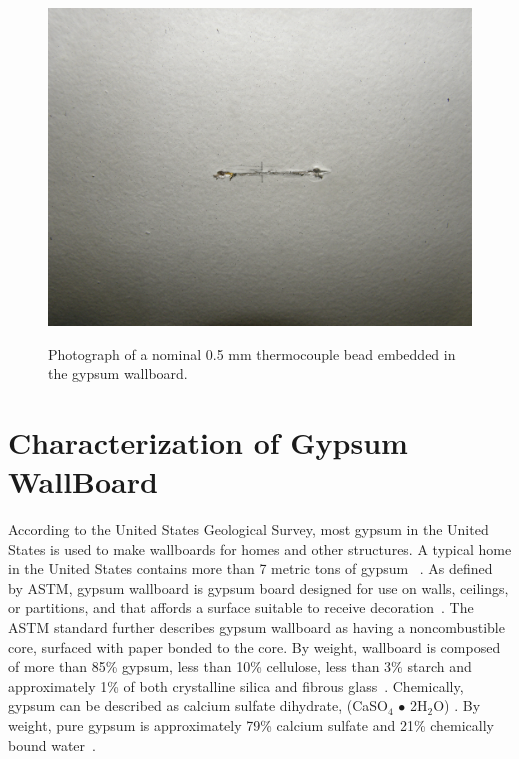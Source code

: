 \documentclass[twoside]{uocthesis}
\begin{document}
{ \begin{figure}
 	\centering
 	\includegraphics[width=\textwidth]{../Figures/IWGB_TC_Slit}\\
 	\caption[Photograph of a thermocouple embedded in the gypsum wallboard]{Photograph of a nominal 0.5 mm thermocouple bead embedded in the gypsum wallboard.}
 	\label{IWGB_TC_Slit}
 \end{figure}


\section{Characterization of Gypsum WallBoard}

According to the United States Geological Survey, most gypsum in the United States is used to make wallboards for homes and other structures.  A typical home in the United States contains more than 7 metric tons of gypsum ~\cite{USGS:2015}.  As defined by ASTM, gypsum wallboard is gypsum board designed for use on walls, ceilings, or partitions, and that affords a surface suitable to receive decoration~\cite{ASTM_C1396}. The ASTM standard further describes gypsum wallboard as having a noncombustible core, surfaced with paper bonded to the core. By weight, wallboard is composed of more than 85\% gypsum, less than 10\% cellulose, less than 3\% starch and approximately 1\% of both crystalline silica and fibrous glass~\cite{GA:2010}. Chemically, gypsum can be described as calcium sulfate dihydrate, (CaSO$_{4}$ $\bullet$ 2H$_{2}$O) .  By weight, pure gypsum is approximately 79\% calcium sulfate and 21\% chemically bound water~\cite{Lawson:1977}.

}
\end{document}
